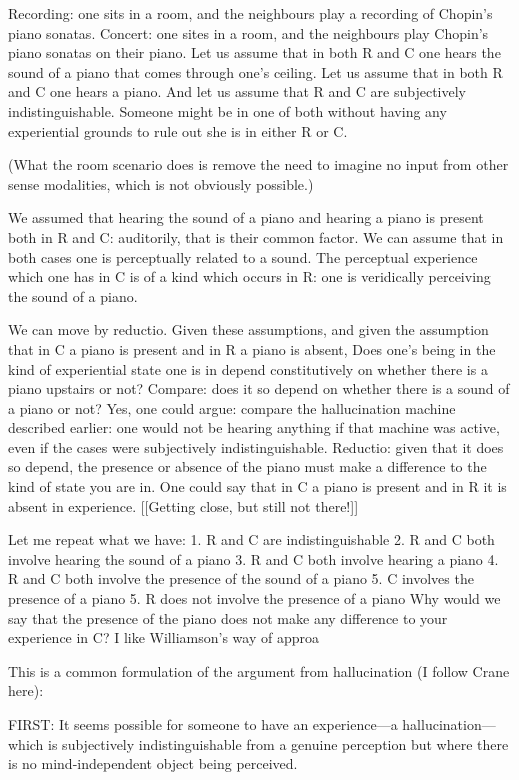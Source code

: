 \documentclass[sloppy, journal, git, bytitle, dodraft]{humapap}
\begin{document}
Recording: one sits in a room, and the neighbours play a recording of Chopin's piano sonatas. Concert: one sites in a room, and the neighbours play Chopin's piano sonatas on their piano. Let us assume that in both R and C one hears the sound of a piano that comes through one's ceiling. Let us assume that in both R and C one hears a piano. And let us assume that R and C are subjectively indistinguishable. Someone might be in one of both without having any experiential grounds to rule out she is in either R or C. 

(What the room scenario does is remove the need to imagine no input from other sense modalities, which is not obviously possible.)

We assumed that hearing the sound of a piano and hearing a piano is present both in R and C: auditorily, that is their common factor. We can assume that in both cases one is perceptually related to a sound. The perceptual experience which one has in C is of a kind which occurs in R: one is veridically perceiving the sound of a piano. 

We can move by reductio. Given these assumptions, and given the assumption that in C a piano is present and in R a piano is absent, Does one's being in the kind of experiential state one is in depend constitutively on whether there is a piano upstairs or not? 
Compare: does it so depend on whether there is a sound of a piano or not? Yes, one could argue: compare the hallucination machine described earlier: one would not be hearing anything if that machine was active, even if the cases were subjectively indistinguishable. 
Reductio: given that it does so depend, the presence or absence of the piano must make a difference to the kind of state you are in. One could say that in C a piano is present and in R it is absent in experience. [[Getting close, but still not there!]]

Let me repeat what we have:
1. R and C are indistinguishable
2. R and C both involve hearing the sound of a piano
3. R and C both involve hearing a piano
4. R and C both involve the presence of the sound of a piano
5. C involves the presence of a piano
5. R does not involve the presence of a piano
Why would we say that the presence of the piano does not make any difference to your experience in C? I like Williamson's way of approa


This is a common formulation of the argument from hallucination (I follow Crane here): 

FIRST: It seems possible for someone to have an experience—a hallucination—which is subjectively indistinguishable from a genuine perception but where there is no mind-independent object being perceived.
\end{document}
